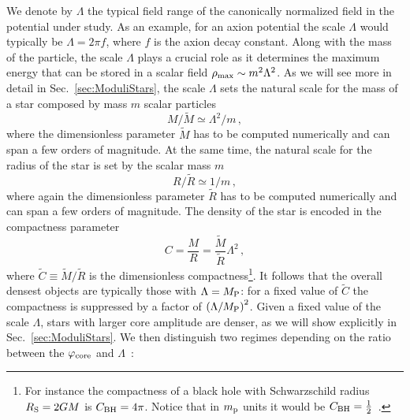 \documentclass[11pt,a4paper]{article}
\begin{document}
We denote by $\Lambda$ the typical field range of the canonically normalized field in the potential under study. As an example, for an axion potential the scale $\Lambda$ would typically be $ \Lambda = 2 \pi f$, where $f$ is the axion decay constant. Along with the mass of the particle, the scale $\Lambda$ plays a crucial role as it determines the maximum energy that can be stored in a scalar field $\rho_{\rm max} \sim m^2 \Lambda^2$. As we will see more in detail in Sec.~\ref{sec:ModuliStars}, the scale $\Lambda$ sets the natural scale for the mass of a star composed by mass $m$ scalar particles
\begin{equation}
M/\tilde{M} \simeq \Lambda^2/m \,,
\end{equation}
where the dimensionless parameter $\tilde{M}$ has to be computed numerically and can span a few orders of magnitude. At the same time, the natural scale for the radius of the star is set by the scalar mass $m$
\begin{equation}
R/\tilde{R} \simeq 1/m \,,
\end{equation}
where again the dimensionless parameter $\tilde{R}$ has to be computed numerically and can span a few orders of magnitude. 
The density of the star is encoded in the compactness parameter
\begin{equation}
\label{eq:CompactnessDef}
C = \frac{M}{R} = \frac{\tilde{M}}{\tilde{R}} \Lambda^2 \,,
\end{equation}
where $\tilde{C} \equiv \tilde{M}/\tilde{R}$ is the dimensionless compactness\footnote{For instance the compactness of a black hole with Schwarzschild radius $R_{\rm S} = 2 G M$ is $C_{\rm BH} = 4 \pi$. Notice that in $m_{\rm p}$ units it would be $C_{\rm BH} = \frac{1}{2}$~\cite{Giudice:2016zpa}.}. It follows that the overall densest objects are typically those with $\Lambda = M_{\rm P}$: for a fixed value of $\tilde{C}$ the compactness is suppressed by a factor of $\left(\Lambda/M_{\rm P}\right)^2$. Given a fixed value of the scale $\Lambda$, stars with larger core amplitude are denser, as we will show explicitly in Sec.~\ref{sec:ModuliStars}. We then distinguish two regimes depending on the ratio between the $\varphi_{\rm core}$ and $\Lambda$~\cite{UrenaLopez:2002gx, Visinelli:2017ooc}:
\end{document}
